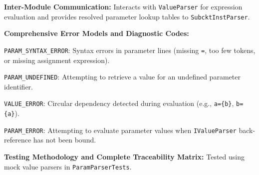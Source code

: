 \textbf{Inter-Module Communication:} Interacts with \texttt{ValueParser} for expression evaluation and provides resolved parameter lookup tables to \texttt{SubcktInstParser}.

\textbf{Comprehensive Error Models and Diagnostic Codes:}
\begin{compactitem}
    \item \texttt{PARAM\_SYNTAX\_ERROR}: Syntax errors in parameter lines (missing \texttt{=}, too few tokens, or missing assignment expression).
    \item \texttt{PARAM\_UNDEFINED}: Attempting to retrieve a value for an undefined parameter identifier.
    \item \texttt{VALUE\_ERROR}: Circular dependency detected during evaluation (e.g., \texttt{a=\{b\}}, \texttt{b=\{a\}}).
    \item \texttt{PARAM\_ERROR}: Attempting to evaluate parameter values when \texttt{IValueParser} back-reference has not been bound.
\end{compactitem}

\textbf{Testing Methodology and Complete Traceability Matrix:} Tested using mock value parsers in \texttt{ParamParserTests}.


